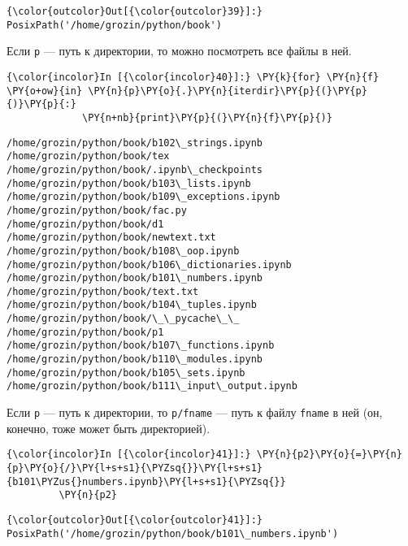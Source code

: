             \begin{Verbatim}[commandchars=\\\{\}]
{\color{outcolor}Out[{\color{outcolor}39}]:} PosixPath('/home/grozin/python/book')
\end{Verbatim}
        
    Если \texttt{p} --- путь к директории, то можно посмотреть все файлы в
ней.

    \begin{Verbatim}[commandchars=\\\{\}]
{\color{incolor}In [{\color{incolor}40}]:} \PY{k}{for} \PY{n}{f} \PY{o+ow}{in} \PY{n}{p}\PY{o}{.}\PY{n}{iterdir}\PY{p}{(}\PY{p}{)}\PY{p}{:}
             \PY{n+nb}{print}\PY{p}{(}\PY{n}{f}\PY{p}{)}
\end{Verbatim}

    \begin{Verbatim}[commandchars=\\\{\}]
/home/grozin/python/book/b102\_strings.ipynb
/home/grozin/python/book/tex
/home/grozin/python/book/.ipynb\_checkpoints
/home/grozin/python/book/b103\_lists.ipynb
/home/grozin/python/book/b109\_exceptions.ipynb
/home/grozin/python/book/fac.py
/home/grozin/python/book/d1
/home/grozin/python/book/newtext.txt
/home/grozin/python/book/b108\_oop.ipynb
/home/grozin/python/book/b106\_dictionaries.ipynb
/home/grozin/python/book/b101\_numbers.ipynb
/home/grozin/python/book/text.txt
/home/grozin/python/book/b104\_tuples.ipynb
/home/grozin/python/book/\_\_pycache\_\_
/home/grozin/python/book/p1
/home/grozin/python/book/b107\_functions.ipynb
/home/grozin/python/book/b110\_modules.ipynb
/home/grozin/python/book/b105\_sets.ipynb
/home/grozin/python/book/b111\_input\_output.ipynb

    \end{Verbatim}

    Если \texttt{p} --- путь к директории, то
\texttt{p/\textquotesingle{}fname\textquotesingle{}} --- путь к файлу
\texttt{fname} в ней (он, конечно, тоже может быть директорией).

    \begin{Verbatim}[commandchars=\\\{\}]
{\color{incolor}In [{\color{incolor}41}]:} \PY{n}{p2}\PY{o}{=}\PY{n}{p}\PY{o}{/}\PY{l+s+s1}{\PYZsq{}}\PY{l+s+s1}{b101\PYZus{}numbers.ipynb}\PY{l+s+s1}{\PYZsq{}}
         \PY{n}{p2}
\end{Verbatim}

            \begin{Verbatim}[commandchars=\\\{\}]
{\color{outcolor}Out[{\color{outcolor}41}]:} PosixPath('/home/grozin/python/book/b101\_numbers.ipynb')
\end{Verbatim}
        
